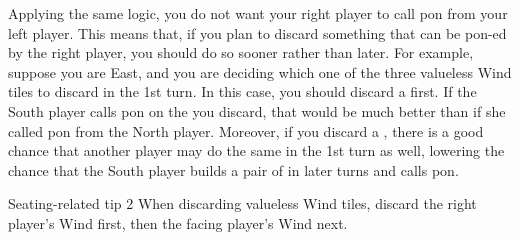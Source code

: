 \bigskip
Applying the same logic, you do not want your right player to call {\jap pon} from your left player. This means that, if you plan to discard something that can be {\jap pon}-ed by the right player, you should do so sooner rather than later. For example, suppose you are East, and you are deciding which one of the three valueless Wind tiles {\large\nan\xi\bei} to discard in the 1st turn. In this case, you should discard a {\large\nan} first. If the South player calls {\jap pon} on the {\large\nan} you discard, that would be much better than if she called {\jap pon} from the North player. Moreover, if you discard a {\large\nan}, there is a good chance that another player may do the same in the 1st turn as well, lowering the chance that the South player builds a pair of {\large\nan} in later turns and calls {\jap pon}. 

\begin{itembox}[c]{Seating-related tip 2}
When discarding valueless Wind tiles, discard the right player's Wind first, then the facing player's Wind next.
\end{itembox}



